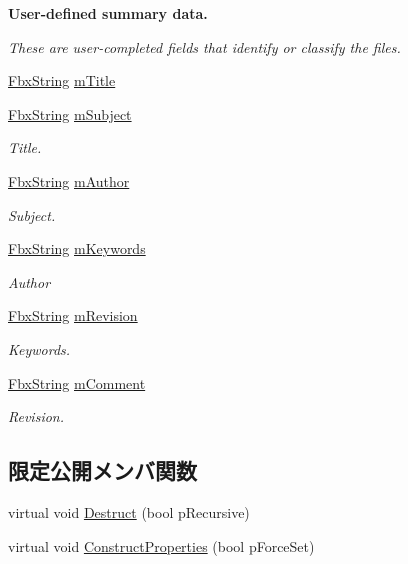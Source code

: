 \begin{Indent}\textbf{ User-\/defined summary data.}\par
{\em These are user-\/completed fields that identify or classify the files. }\begin{DoxyCompactItemize}
\item 
\hyperlink{class_fbx_string}{Fbx\+String} \hyperlink{class_fbx_document_info_a19d4298a823606afc9501e4915fd4d46}{m\+Title}
\item 
\hyperlink{class_fbx_string}{Fbx\+String} \hyperlink{class_fbx_document_info_a2ef18e00ea86b5ebb46cab156ee1dffb}{m\+Subject}
\begin{DoxyCompactList}\small\item\em Title. \end{DoxyCompactList}\item 
\hyperlink{class_fbx_string}{Fbx\+String} \hyperlink{class_fbx_document_info_a94f6f7586adf1ae4c519f0fd0ab63e7f}{m\+Author}
\begin{DoxyCompactList}\small\item\em Subject. \end{DoxyCompactList}\item 
\hyperlink{class_fbx_string}{Fbx\+String} \hyperlink{class_fbx_document_info_abd88716fcd0a141d04b3ffbd5b3b22e1}{m\+Keywords}
\begin{DoxyCompactList}\small\item\em Author \end{DoxyCompactList}\item 
\hyperlink{class_fbx_string}{Fbx\+String} \hyperlink{class_fbx_document_info_a5566da0013c015bb4b58f0eb13814a9a}{m\+Revision}
\begin{DoxyCompactList}\small\item\em Keywords. \end{DoxyCompactList}\item 
\hyperlink{class_fbx_string}{Fbx\+String} \hyperlink{class_fbx_document_info_ae26126fbe729919670ddc4140a80f517}{m\+Comment}
\begin{DoxyCompactList}\small\item\em Revision. \end{DoxyCompactList}\end{DoxyCompactItemize}
\end{Indent}
\subsection*{限定公開メンバ関数}
\begin{DoxyCompactItemize}
\item 
virtual void \hyperlink{class_fbx_document_info_a799c245b74093eb0c68fddfbe3596cee}{Destruct} (bool p\+Recursive)
\item 
virtual void \hyperlink{class_fbx_document_info_ae66f4663bce15c6e9c60184764066983}{Construct\+Properties} (bool p\+Force\+Set)
\end{DoxyCompactItemize}

